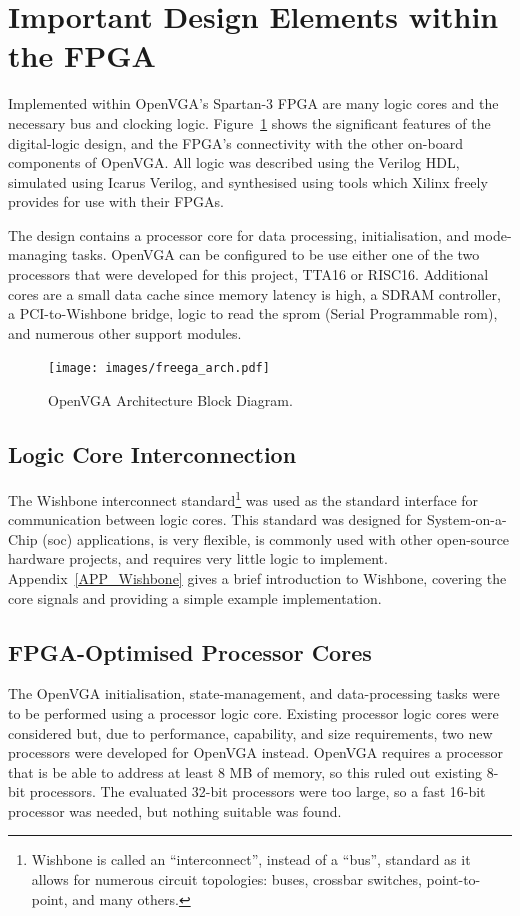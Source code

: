 \section{Important Design Elements within the FPGA}
\label{OPENVGA_Logic_Cores}
Implemented within OpenVGA's Spartan-3 FPGA are many logic cores and the
necessary bus and clocking logic. Figure~\ref{OPENVGA_Arch} shows the significant
features of the digital-logic design, and the FPGA's connectivity with the other
on-board components of OpenVGA. All logic was described using the Verilog HDL,
simulated using Icarus Verilog, and synthesised using tools which Xilinx freely
provides for use with their FPGAs.

The design contains a processor core for data processing, initialisation, and
mode-managing tasks. OpenVGA can be configured to be use either one of the two
processors that were developed for this project, TTA16 or RISC16. Additional
cores are a small data cache since memory latency is high, a SDRAM controller, a
PCI-to-Wishbone bridge, logic to read the \gls{sprom} (Serial Programmable \gls{rom}),
and numerous other support modules.

\begin{figure}[h!]
\begin{center}
\texttt{[image: images/freega\_arch.pdf]}
\caption[OpenVGA Architecture Block Diagram]{OpenVGA Architecture Block Diagram.}
\label{OPENVGA_Arch}
\end{center}
\end{figure}


\subsection{Logic Core Interconnection}
The Wishbone interconnect standard\footnote{Wishbone is called an
``interconnect'', instead of a ``bus'', standard as it allows for numerous
circuit topologies: buses, crossbar switches, point-to-point, and many others.}
was used as the standard interface for communication between logic cores. This
standard was designed for System-on-a-Chip (\gls{soc}) applications, is very flexible, is commonly
used with other open-source hardware projects, and requires very little logic to
implement. Appendix~\ref{APP_Wishbone} gives a brief introduction to Wishbone,
covering the core signals and providing a simple example implementation.


\subsection{FPGA-Optimised Processor Cores}
The OpenVGA initialisation, state-management, and data-processing tasks were to
be performed using a processor logic core. Existing processor logic cores were
considered but, due to performance, capability, and size requirements, two new
processors were developed for OpenVGA instead. OpenVGA requires a processor that
is be able to address at least 8 MB of memory, so this ruled out existing 8-bit
processors. The evaluated 32-bit processors were too large, so a fast 16-bit
processor was needed, but nothing suitable was found.

